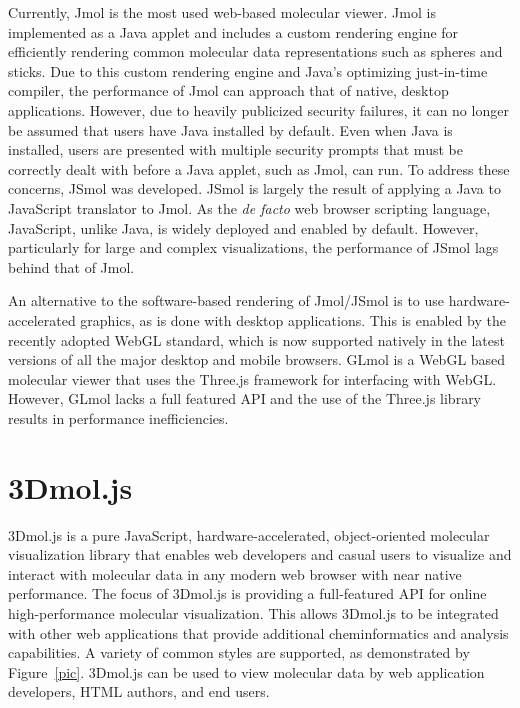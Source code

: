 \documentclass[]{bioinfo}
\begin{document}
Currently, Jmol\cite{jmol,hanson2010jmol} is the most used web-based molecular viewer. Jmol is implemented as a Java applet and includes a custom rendering engine for efficiently rendering common molecular data representations such as spheres and sticks.  Due to this custom rendering engine and Java's optimizing just-in-time compiler, the performance of Jmol can approach that of native, desktop applications.  However, due to heavily publicized security failures, it can no longer be assumed that users have Java installed by default\cite{doomedjava}.  Even when Java is installed, users are presented with multiple security prompts that must be correctly dealt with before a Java applet, such as Jmol, can run.
To address these concerns, JSmol\cite{hanson2013jsmol} was developed. JSmol is largely the result of applying a Java to JavaScript translator to Jmol. As the \textit{de facto} web browser scripting language, JavaScript, unlike Java, is widely deployed and enabled by default.  However, particularly for large and complex visualizations, the performance of JSmol lags behind that of Jmol.

An alternative to the software-based rendering of Jmol/JSmol is to use hardware-accelerated graphics, as is done with desktop applications.  This is enabled by the recently adopted WebGL\cite{webgl} standard, which is now supported natively in the latest versions of all the major desktop and mobile browsers. GLmol\cite{glmol} is a WebGL based molecular viewer that uses the Three.js\cite{threejs} framework for interfacing with WebGL.  However, GLmol lacks a full featured API and the use of the Three.js library results in performance inefficiencies.



\section{3Dmol.js}

3Dmol.js is a pure JavaScript, hardware-accelerated, object-oriented molecular visualization library that enables web developers and casual users to visualize and interact with molecular data in any modern web browser with near native performance.  The focus of 3Dmol.js is providing a full-featured API for online high-performance molecular visualization. This allows 3Dmol.js to be integrated with other web applications that provide additional cheminformatics and analysis capabilities.
A variety of common styles are supported, as demonstrated by Figure~\ref{pic}.
3Dmol.js can be used to view molecular data by web application developers, HTML authors, and end users.  
\end{document}
